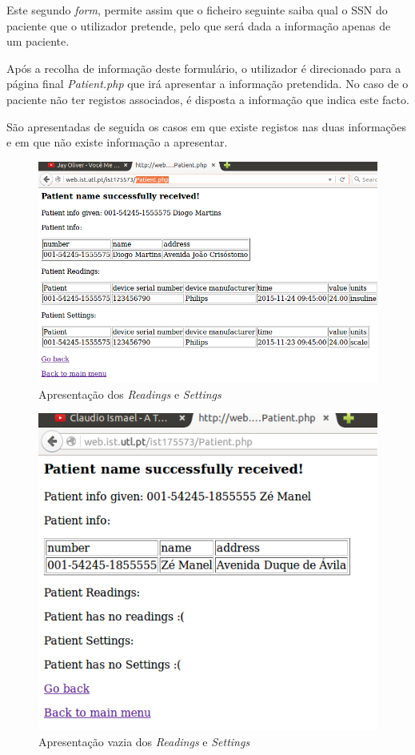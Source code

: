 \documentclass[a4paper]{article}
\begin{document}
Este segundo \textit{form}, permite assim que o ficheiro seguinte saiba qual o SSN do paciente que o utilizador pretende, pelo que será dada a informação apenas de um paciente.

Após a recolha de informação deste formulário, o utilizador é direcionado para a página final \textit{Patient.php} que irá apresentar a informação pretendida. No caso de o paciente não ter registos associados, é disposta a informação que indica este facto.

São apresentadas de seguida os casos em que existe registos nas duas informações e em que não existe informação a apresentar.

\begin{figure}[ht!]
\centering
\includegraphics[scale=0.53]{diogo.png}
\caption{Apresentação dos \textit{Readings} e \textit{Settings}}
\end{figure}

\begin{figure}[ht!]
\centering
\includegraphics[scale=0.53]{ze.png}
\caption{Apresentação vazia dos \textit{Readings} e \textit{Settings}}
\end{figure}
\end{document}
